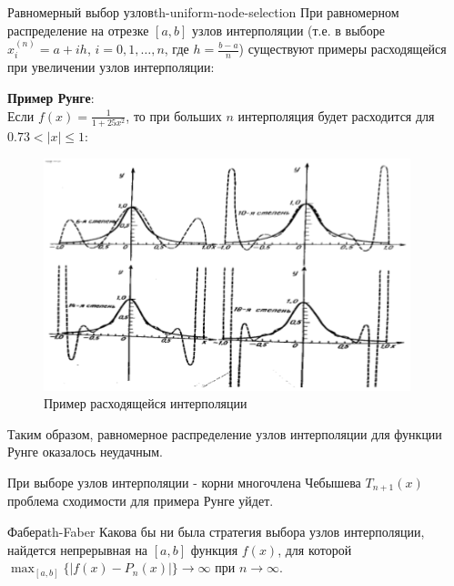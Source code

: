 \documentclass[14pt]{extarticle}
\begin{document}
        \begin{theorem}{Равномерный выбор узлов}{th-uniform-node-selection}            
            При равномерном распределение на отрезке $[a, b]$ узлов интерполяции (т.е. в выборе $x_{i}^{(n)} = a + ih$, $i = 0, 1, \ldots, n$, где $h = \frac{b-a}{n}$) существуют примеры расходящейся при увеличении узлов интерполяции:

            \vspace{\baselineskip}

            \textbf{Пример Рунге}:\\
            Если $f(x) = \frac{1}{1 + 25x^{2}}$, то при больших $n$ интерполяция будет расходится для $0.73 < |x| \leq 1$:

            \begin{figure}[H]
                \centering
                \includegraphics[scale=0.7]{images/runge-interpolation-ex.png}
                \caption{Пример расходящейся интерполяции}
                \label{fig:runge-interpolation}
            \end{figure}

            Таким образом, равномерное распределение узлов интерполяции для функции Рунге оказалось неудачным.            
        \end{theorem}

        При выборе узлов интерполяции - корни многочлена Чебышева $T_{n+1}(x)$ проблема сходимости для примера Рунге уйдет.

        \vspace{\baselineskip}

        \begin{theorem}{Фабера}{th-Faber}
            Какова бы ни была стратегия выбора узлов интерполяции, найдется непрерывная на $[a, b]$ функция $f(x)$, для которой $\max_{[a, b]} \{|f(x) - P_{n}(x)|\} \to \infty$  при $n \to \infty$.
        \end{theorem}
\end{document}
